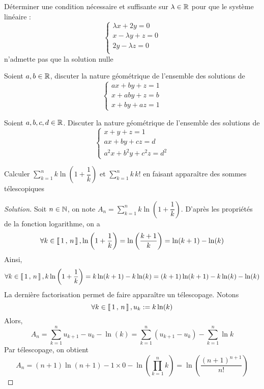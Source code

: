 \documentclass{classe}
\newenvironment{solution}
  {\renewcommand\qedsymbol{$\blacksquare$}\begin{proof}[Solution]}
  {\end{proof}}
\begin{document}
\begin{exercice}
Déterminer une condition nécessaire et suffisante sur $\lambda\in\mathbb{R}$ pour que le système linéaire :
\[\left\{\begin{array}{l}
\lambda x+2y=0\\
x-\lambda y+z=0\\
2y-\lambda z=0\\
\end{array}\right.
\]
n'admette pas que la solution nulle
\end{exercice}

\begin{exercice}
Soient $a, b \in\mathbb{R}$, discuter la nature géométrique de l'ensemble des solutions de 
\[
\left\{\begin{array}{l}
ax+by+z=1\\
x+aby+z=b\\
x+by+az=1
\end{array}\right.
\]
\end{exercice}

\begin{exercice}
Soient $a,b,c,d\in\mathbb{R}$. Discuter la nature géométrique de l'ensemble des solutions de 
\[
\left\{\begin{array}{l}
x+y+z=1\\
ax+by+cz=d\\
a^2 x+b^2 y+c^2 z=d^2
\end{array}\right.
\]
\end{exercice}


\begin{exercice}
Calculer $\displaystyle\sum\limits_{k=1}^{n} k \ln\left(1+\dfrac{1}{k}\right)$ et $\displaystyle\sum\limits_{k=1}^{n}k \, k!$ en faisant apparaître des sommes télescopiques 
\end{exercice}

\begin{solution}
Soit $n \in \mathbb{N}$, on note $A_n = \displaystyle\sum\limits_{k=1}^{n} k \ln\left(1+\dfrac{1}{k}\right)$. D'après les propriétés de la fonction logarithme, on a 
\[
\forall k \in \left\llbracket \, 1 \, , \, n \, \right\rrbracket, 
\ln\left(1+\dfrac{1}{k}\right)
= \ln\left(\dfrac{k+ 1}{k}\right) 
= \ln(k+1) - \ln(k) 
\]
Ainsi, 
\[
\forall k \in \left\llbracket \, 1 \, , \, n \, \right\rrbracket, 
k  \ln\left(1+\dfrac{1}{k}\right)
= k  \ln(k+1) - k \ln(k) 
= (k + 1)  \ln(k+1) - k \ln(k) - \ln(k)
\]
La dernière factorisation permet de faire apparaître un télescopage. Notons
\[
\forall k \in \left\llbracket \, 1 \, , \, n \, \right\rrbracket, u_k :=  k \ln(k)
\]
Alors, 
\[
A_n 
= \displaystyle\sum\limits_{k=1}^{n} u_{k+1} - u_{k} - \ln(k) =  \displaystyle\sum\limits_{k=1}^{n} (u_{k+1} - u_{k}) - \displaystyle\sum\limits_{k=1}^{n}\ln{k}
\]
Par télescopage, on obtient 
\[
A_n = (n+1)\ln(n+1) - 1 \times 0 - \ln\left(\displaystyle\prod\limits_{k=1}^{n} k\right) = \ln\left(\dfrac{(n+1)^{n+1}}{n!}\right)
\]
\end{solution}
\end{document}
